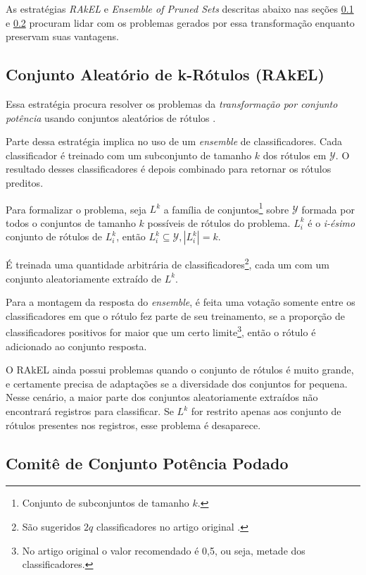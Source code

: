\documentclass[runningheads,a4paper]{llncs}
\begin{document}
As estratégias \textit{RAkEL} \cite{Tsoumakas2007-wm} e \textit{Ensemble of Pruned Sets} \cite{Read2008-bt} descritas abaixo nas seções \ref{subsec:rakel} e \ref{subsec:eps} procuram lidar com os problemas gerados por essa transformação enquanto preservam suas vantagens.

\subsection{Conjunto Aleatório de k-Rótulos (RAkEL)} \label{subsec:rakel}

Essa estratégia procura resolver os problemas da \textit{transformação por conjunto potência} usando conjuntos aleatórios de rótulos \cite{Tsoumakas2007-wm}.

Parte dessa estratégia implica no uso de um \textit{ensemble} de classificadores. Cada classificador é treinado com um subconjunto de tamanho $k$ dos rótulos em $\mathcal{Y}$. O resultado desses classificadores é depois combinado para retornar os rótulos preditos.

Para formalizar o problema, seja $L^k$ a família de conjuntos\footnote{Conjunto de subconjuntos de tamanho $k$.} sobre $\mathcal{Y}$ formada por todos o conjuntos de tamanho $k$ possíveis de rótulos do problema. $L^k_i$ é o \textit{i-ésimo} conjunto de rótulos de $L^k_i$, então  $L^k_i \subseteq \mathcal{Y}, |L^k_i| = k$.

É treinada uma quantidade arbitrária de classificadores\footnote{São sugeridos $2q$ classificadores no artigo original \cite{Tsoumakas2007-wm}.}, cada um com um conjunto aleatoriamente extraído de $L^k$.

Para a montagem da resposta do \textit{ensemble}, é feita uma votação somente entre os classificadores em que o rótulo fez parte de seu treinamento, se a proporção de classificadores positivos for maior que um certo limite\footnote{No artigo original o valor recomendado é 0,5, ou seja, metade dos classificadores.}, então o rótulo é adicionado ao conjunto resposta.

O RAkEL ainda possui problemas quando o conjunto de rótulos é muito grande, e certamente precisa de adaptações se a diversidade dos conjuntos for pequena. Nesse cenário, a maior parte dos conjuntos aleatoriamente extraídos não encontrará registros para classificar. Se $L^k$ for restrito apenas aos conjunto de rótulos presentes nos registros, esse problema é desaparece.
 
 
\subsection{Comitê de Conjunto Potência Podado} \label{subsec:eps}
\end{document}
